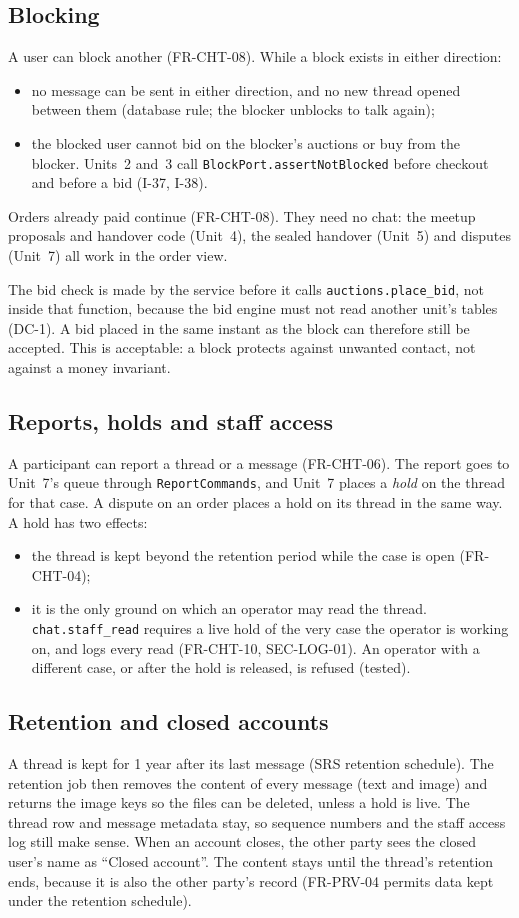 \documentclass[11pt,a4paper]{article}
\begin{document}
\subsection{Blocking}
\label{sec:block}
A user can block another (FR-CHT-08). While a block exists in either direction:
\begin{itemize}[nosep]
  \item no message can be sent in either direction, and no new thread opened between them (database rule; the blocker unblocks to talk again);
  \item the blocked user cannot bid on the blocker's auctions or buy from the blocker. Units~2 and~3 call \texttt{BlockPort.assertNotBlocked} before checkout and before a bid (I-37, I-38).
\end{itemize}
Orders already paid continue (FR-CHT-08). They need no chat: the meetup proposals and handover code (Unit~4), the sealed handover (Unit~5) and disputes (Unit~7) all work in the order view.

The bid check is made by the service before it calls \texttt{auctions.place\_bid}, not inside that function, because the bid engine must not read another unit's tables (DC-1). A bid placed in the same instant as the block can therefore still be accepted. This is acceptable: a block protects against unwanted contact, not against a money invariant.

\subsection{Reports, holds and staff access}
\label{sec:holds}
A participant can report a thread or a message (FR-CHT-06). The report goes to Unit~7's queue through \texttt{ReportCommands}, and Unit~7 places a \emph{hold} on the thread for that case. A dispute on an order places a hold on its thread in the same way. A hold has two effects:
\begin{itemize}[nosep]
  \item the thread is kept beyond the retention period while the case is open (FR-CHT-04);
  \item it is the only ground on which an operator may read the thread. \texttt{chat.staff\_read} requires a live hold of the very case the operator is working on, and logs every read (FR-CHT-10, SEC-LOG-01). An operator with a different case, or after the hold is released, is refused (tested).
\end{itemize}

\subsection{Retention and closed accounts}
A thread is kept for 1 year after its last message (SRS retention schedule). The retention job then removes the content of every message (text and image) and returns the image keys so the files can be deleted, unless a hold is live. The thread row and message metadata stay, so sequence numbers and the staff access log still make sense. When an account closes, the other party sees the closed user's name as ``Closed account''. The content stays until the thread's retention ends, because it is also the other party's record (FR-PRV-04 permits data kept under the retention schedule).
\end{document}
